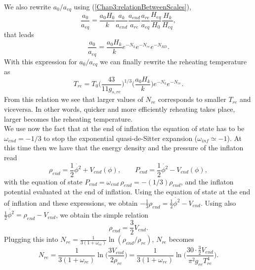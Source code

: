 \documentclass[11pt,a4paper,twoside]{book}
\begin{document}
We also rewrite $ a_{0}/a_{eq} $ using (\ref{Chap3:relationBetweenScales}),
\begin{equation}
\label{Chap3:a0/aeq}
\frac{a_{0}}{a_{eq}}= \frac{a_{0}H_{0}}{k}\frac{a_{k}}{a_{end}}\frac{a_{end}}{a_{re}}\frac{a_{re}}{a_{eq}}\frac{H_{eq}}{H_{0}}\frac{H_{k}}{H_{eq}},
\end{equation}
that leads
\begin{equation}
\frac{a_{0}}{a_{eq}}= \frac{a_{0}H_{k}}{k}e^{-N_{k}}e^{-N_{re}}e^{-N_{RD}}.
\end{equation}
With this expression for $ a_{0}/a_{eq} $ we can finally rewrite the reheating temperature as
\begin{equation}
	\label{Chap3:reheatingTemperature3}
	T_{re} = T_{0}\Bigg(\frac{43}{11 g_{s,re}}\Bigg)^{1/3}\Bigg( \frac{a_{0}H_{k}}{k} \Bigg)e^{-N_{k}}e^{-N_{re}}.
\end{equation}
From this relation we see that larger values of $ N_{re} $ corresponds to smaller $ T_{re} $ and viceversa. In other words, quicker and more efficiently reheating takes place, larger becomes the reheating temperature. \\
We use now the fact that at the end of inflation the equation of state has to be $ \omega_{end}=-1/3 $ to stop the exponential quasi-de-Sitter expansion ($\omega_{inf} \simeq -1$). At this time then we have that the energy density and the pressure of the inflaton read
\begin{equation}
	\rho_{end} = \frac{1}{2}\dot{\phi^{2}} + V_{end}(\phi),
	\qquad
	P_{end}=  \frac{1}{2}\dot{\phi^{2}} - V_{end}(\phi),
\end{equation}
with the equation of state $ P_{end}=\omega_{end}\ \rho_{end}=-(1/3)\rho_{end} $, and the inflaton potential evaluated at the end of inflation. Using the equation of state at the end of inflation and  these expressions, we obtain 
$ -\frac{1}{3}\rho_{end}= \frac{1}{2}\dot{\phi^{2}}-V_{end} $. Using also $ \frac{1}{2}\dot{\phi^{2}}=\rho_{end}-V_{end} $, we obtain the simple relation 
\begin{equation}
	\label{Chap3:energyDensityPressure}
	\rho_{end}=\frac{3}{2}V_{end}.
\end{equation}
Plugging this into $ N_{re}=\frac{1}{3(1+\omega_{re})}\ln(\rho_{end}/\rho_{re})$, $ N_{re} $ becomes
\begin{equation}
\label{Chap3:Nre2}
N_{re}=\dfrac{1}{3(1+\omega_{re})}\ln \Bigg(\frac{3 V_{end}}{2\rho_{re}} \Bigg) = \dfrac{1}{3(1+\omega_{re})}\ln \Bigg( \frac{30 \cdot \frac{3}{2} V_{end}}{\pi^{2}g_{re}T^{4}_{re}}\Bigg).
\end{equation}
\end{document}

